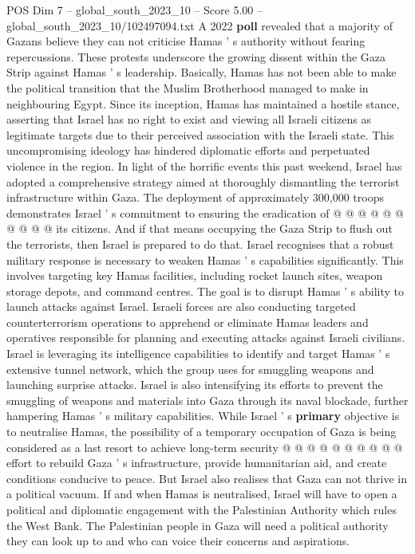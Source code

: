 \begin{textsample}{POS Dim 7 – global\_south\_2023\_10 – Score 5.00 – global\_south\_2023\_10/102497094.txt}
A 2022 \textbf{poll} revealed that a majority of Gazans believe they can not criticise Hamas ' s authority without fearing repercussions.
These protests underscore the growing dissent within the Gaza Strip against Hamas ' s leadership.
Basically, Hamas has not been able to make the political transition that the Muslim Brotherhood managed to make in neighbouring Egypt.
Since its inception, Hamas has maintained a hostile stance, asserting that Israel has no right to exist and viewing all Israeli citizens as legitimate targets due to their perceived association with the Israeli state.
This uncompromising ideology has hindered diplomatic efforts and perpetuated violence in the region.
In light of the horrific events this past weekend, Israel has adopted a comprehensive strategy aimed at thoroughly dismantling the terrorist infrastructure within Gaza.
The deployment of approximately 300,000 troops demonstrates Israel ' s commitment to ensuring the eradication of @ @ @ @ @ @ @ @ @ @ its citizens.
And if that means occupying the Gaza Strip to flush out the terrorists, then Israel is prepared to do that.
Israel recognises that a robust military response is necessary to weaken Hamas ' s capabilities significantly.
This involves targeting key Hamas facilities, including rocket launch sites, weapon storage depots, and command centres.
The goal is to disrupt Hamas ' s ability to launch attacks against Israel.
Israeli forces are also conducting targeted counterterrorism operations to apprehend or eliminate Hamas leaders and operatives responsible for planning and executing attacks against Israeli civilians.
Israel is leveraging its intelligence capabilities to identify and target Hamas ' s extensive tunnel network, which the group uses for smuggling weapons and launching surprise attacks.
Israel is also intensifying its efforts to prevent the smuggling of weapons and materials into Gaza through its naval blockade, further hampering Hamas ' s military capabilities.
While Israel ' s \textbf{primary} objective is to neutralise Hamas, the possibility of a temporary occupation of Gaza is being considered as a last resort to achieve long-term security @ @ @ @ @ @ @ @ @ @ effort to rebuild Gaza ' s infrastructure, provide humanitarian aid, and create conditions conducive to peace.
But Israel also realises that Gaza can not thrive in a political vacuum.
If and when Hamas is neutralised, Israel will have to open a political and diplomatic engagement with the Palestinian Authority which rules the West Bank.
The Palestinian people in Gaza will need a political authority they can look up to and who can voice their concerns and aspirations.

\end{textsample}
